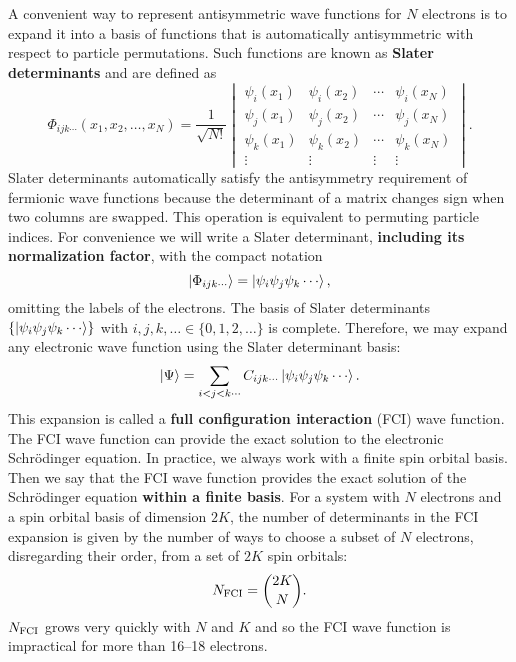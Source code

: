 \documentclass[../Main/chem532-notes.tex]{subfiles}
\begin{document}
A convenient way to represent antisymmetric wave functions for $N$ electrons is to expand it into a basis of functions that is automatically antisymmetric with respect to particle permutations. Such functions are known as \textbf{Slater determinants} and are defined as
\begin{equation}
\Phi_{ijk\cdots}(x_1,x_2,\ldots,x_N) = \frac{1}{\sqrt{N!}} 
\begin{vmatrix}
\psi_i(x_1) & \psi_i(x_2) & \cdots & \psi_i(x_N) \\
\psi_j(x_1) & \psi_j(x_2) & \cdots & \psi_j(x_N) \\
\psi_k(x_1) & \psi_k(x_2) & \cdots & \psi_k(x_N) \\
\vdots & \vdots & \vdots & \vdots
\end{vmatrix}.
\end{equation}
Slater determinants automatically satisfy the antisymmetry requirement of fermionic wave functions because the determinant of a matrix changes sign when two columns are swapped. This operation is equivalent to permuting particle indices.
For convenience we will write a Slater determinant, \textbf{including its normalization factor}, with the compact notation
\begin{equation}
\ket{\Phi_{ijk\cdots}} =\ket{
\psi_i \psi_j \psi_k \cdots},
\end{equation}
omitting the labels of the electrons.
The basis of Slater determinants $\{ \ket{
\psi_i \psi_j \psi_k \cdots} \}$ with $i, j, k, \ldots \in \{0, 1, 2, \ldots \}$ is complete.
Therefore, we may expand any electronic wave function using the Slater determinant basis:
\begin{equation}
\ket{\Psi} = \sum_{i<j<k\cdots} C_{ijk\cdots} \ket{
\psi_i \psi_j \psi_k \cdots}.
\end{equation}
This expansion is called a \textbf{full configuration interaction} (FCI) wave function.
The FCI wave function can provide the exact solution to the electronic Schr\"{o}dinger equation.
In practice, we always work with a finite spin orbital basis. Then we say that the FCI wave function provides the exact solution of the Schr\"{o}dinger equation \textbf{within a finite basis}.
For a system with $N$ electrons and a spin orbital basis of dimension $2K$, the number of determinants in the FCI expansion is given by the number of ways to choose a subset of $N$ electrons, disregarding their order, from a set of $2K$ spin orbitals:
\begin{equation}
N_{\rm FCI} = \binom{2K}{N}.
\end{equation}
$N_{\rm FCI}$ grows very quickly with $N$ and $K$ and so the FCI wave function is impractical for more than 16--18 electrons.
\end{document}
